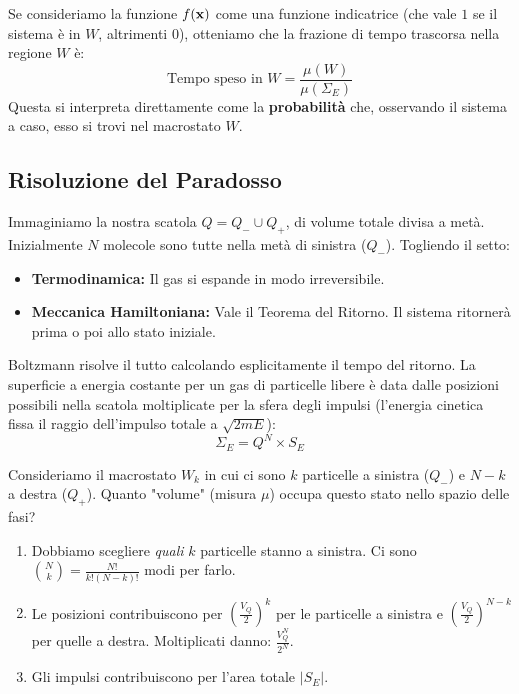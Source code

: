 \documentclass[openany]{book}
\theoremstyle{definition}
\theoremstyle{remark}
\begin{document}
Se consideriamo la funzione $f(\vb{x})$ come una funzione indicatrice (che vale $1$ se il sistema è in $W$, altrimenti $0$), otteniamo che la frazione di tempo trascorsa nella regione $W$ è:
\begin{equation*}
    \text{Tempo speso in } W = \frac{\mu(W)}{\mu(\Sigma_E)}
\end{equation*}
Questa si interpreta direttamente come la \textbf{probabilità} che, osservando il sistema a caso, esso si trovi nel macrostato $W$.

\subsection*{Risoluzione del Paradosso}
Immaginiamo la nostra scatola $Q = Q_- \cup Q_+$, di volume totale divisa a metà. Inizialmente $N$ molecole sono tutte nella metà di sinistra ($Q_-$).
Togliendo il setto:
\begin{itemize}
    \item \textbf{Termodinamica:} Il gas si espande in modo irreversibile.
    \item \textbf{Meccanica Hamiltoniana:} Vale il Teorema del Ritorno. Il sistema ritornerà prima o poi allo stato iniziale.
\end{itemize}

Boltzmann risolve il tutto calcolando esplicitamente il tempo del ritorno.
La superficie a energia costante per un gas di particelle libere è data dalle posizioni possibili nella scatola moltiplicate per la sfera degli impulsi (l'energia cinetica fissa il raggio dell'impulso totale a $\sqrt{2mE}$):
\begin{equation*}
    \Sigma_E = Q^N \times S_E
\end{equation*}

Consideriamo il macrostato $W_k$ in cui ci sono $k$ particelle a sinistra ($Q_-$) e $N-k$ a destra ($Q_+$). Quanto "volume" (misura $\mu$) occupa questo stato nello spazio delle fasi?
\begin{enumerate}
    \item Dobbiamo scegliere \textit{quali} $k$ particelle stanno a sinistra. Ci sono $\binom{N}{k} = \frac{N!}{k!(N-k)!}$ modi per farlo.
    \item Le posizioni contribuiscono per $\left(\frac{V_Q}{2}\right)^k$ per le particelle a sinistra e $\left(\frac{V_Q}{2}\right)^{N-k}$ per quelle a destra. Moltiplicati danno: $\frac{V_Q^N}{2^N}$.
    \item Gli impulsi contribuiscono per l'area totale $|S_E|$.
\end{enumerate}
\end{document}
